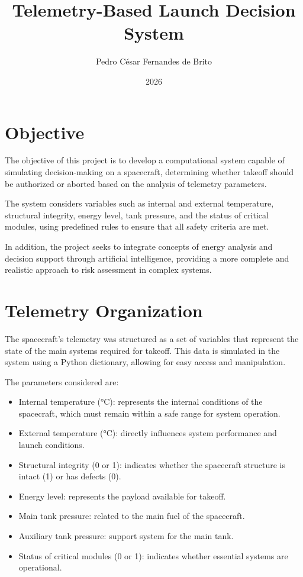 \documentclass[12pt]{article}
\title{Telemetry-Based Launch Decision System}
\author{Pedro César Fernandes de Brito}
\date{2026}
\begin{document}
\maketitle

\tableofcontents
\newpage

\section{Objective}

The objective of this project is to develop a computational system capable of simulating decision-making on a spacecraft, determining whether takeoff should be authorized or aborted based on the analysis of telemetry parameters.

The system considers variables such as internal and external temperature, structural integrity, energy level, tank pressure, and the status of critical modules, using predefined rules to ensure that all safety criteria are met.

In addition, the project seeks to integrate concepts of energy analysis and decision support through artificial intelligence, providing a more complete and realistic approach to risk assessment in complex systems.

\section{Telemetry Organization}

The spacecraft's telemetry was structured as a set of variables that represent the state of the main systems required for takeoff. This data is simulated in the system using a Python dictionary, allowing for easy access and manipulation.

The parameters considered are:

\begin{itemize}
    \item Internal temperature (°C): represents the internal conditions of the spacecraft, which must remain within a safe range for system operation.
    \item External temperature (°C): directly influences system performance and launch conditions.
    \item Structural integrity (0 or 1): indicates whether the spacecraft structure is intact (1) or has defects (0).
    \item Energy level: represents the payload available for takeoff.
    \item Main tank pressure: related to the main fuel of the spacecraft.
    \item Auxiliary tank pressure: support system for the main tank.
    \item Status of critical modules (0 or 1): indicates whether essential systems are operational.
\end{itemize}
\end{document}
